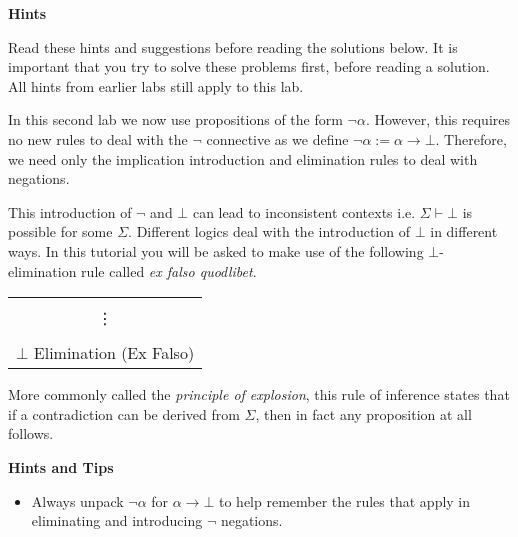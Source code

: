 \documentclass[11pt]{report}
\begin{document}
\newpage
\textbf{Hints}

Read these hints and suggestions before reading the solutions below. It is important that you try to solve these problems first, before reading a solution. All hints from earlier labs still apply to this lab. 

In this second lab we now use propositions of the form $\lnot \alpha$. However, this requires no new rules to deal with the $\lnot$ connective as we define $\lnot \alpha := \alpha \to \bot$. Therefore, we need only the implication introduction and elimination rules to deal with negations. 

This introduction of $\lnot$ and $\bot$ can lead to inconsistent contexts i.e. $\Sigma \vdash \bot$ is possible for some $\Sigma$. Different logics deal with the introduction of $\bot$ in different ways. In this tutorial you will be asked to make use of the following $\bot$-elimination rule called \emph{ex falso quodlibet}.

\begin{center}
\begin{tabular}{c}
	\infer[\XF]{A}{\begin{array}{c}\Sigma \\ \vdots \\ \bot \end{array}}
	\\
	$\bot$ Elimination (Ex Falso)
\end{tabular}
\end{center}

More commonly called the \emph{principle of explosion}, this rule of inference states that if a contradiction can be derived from $\Sigma$, then in fact any proposition at all follows. 

\textbf{Hints and Tips}

\begin{itemize}
	\item[] Always unpack $\lnot \alpha$ for $\alpha \to \bot$ to help remember the rules that apply in eliminating and introducing $\neg$ negations.
\end{itemize}
\end{document}
